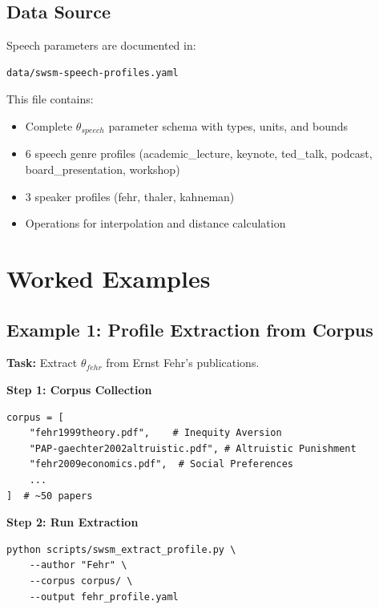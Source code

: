 \subsection{Data Source}
\label{sec:sw-speech-data}

Speech parameters are documented in:
\begin{verbatim}
data/swsm-speech-profiles.yaml
\end{verbatim}

This file contains:
\begin{itemize}
    \item Complete $\theta_{speech}$ parameter schema with types, units, and bounds
    \item 6 speech genre profiles (academic\_lecture, keynote, ted\_talk, podcast, board\_presentation, workshop)
    \item 3 speaker profiles (fehr, thaler, kahneman)
    \item Operations for interpolation and distance calculation
\end{itemize}


\section{Worked Examples}
\label{sec:sw-examples}

\subsection{Example 1: Profile Extraction from Corpus}
\label{sec:sw-ex1}

\textbf{Task:} Extract $\theta_{fehr}$ from Ernst Fehr's publications.

\textbf{Step 1: Corpus Collection}
\begin{verbatim}
corpus = [
    "fehr1999theory.pdf",    # Inequity Aversion
    "PAP-gaechter2002altruistic.pdf", # Altruistic Punishment
    "fehr2009economics.pdf",  # Social Preferences
    ...
]  # ~50 papers
\end{verbatim}

\textbf{Step 2: Run Extraction}
\begin{verbatim}
python scripts/swsm_extract_profile.py \
    --author "Fehr" \
    --corpus corpus/ \
    --output fehr_profile.yaml
\end{verbatim}

